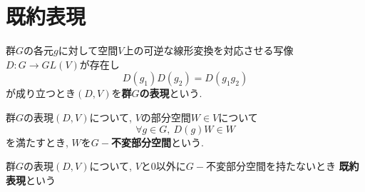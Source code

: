 \section{既約表現}

\begin{deftcolorbox}[title = 群の表現]
    群$G$の各元$g$に対して空間$V$上の可逆な線形変換を対応させる写像$D : G \rightarrow GL(V)$が存在し
    \begin{equation*}
        D(g_1)D(g_2) = D(g_1 g_2)
    \end{equation*}
    が成り立つとき$(D,V)$を\textbf{群$G$の表現}という.
\end{deftcolorbox}

\begin{deftcolorbox}[title = 不変部分空間]
    群$G$の表現$(D,V)$について, $V$の部分空間$W \in V$について
    \begin{equation*}
        \forall g \in G,\ D(g)W \in W
    \end{equation*}
    を満たすとき, $W$を\textbf{$G-$不変部分空間}という.
\end{deftcolorbox}

\begin{deftcolorbox}[title = 既約表現]
    群$G$の表現$(D,V)$について, $V$と$0$以外に$G-$不変部分空間を持たないとき
    \textbf{既約表現}という
\end{deftcolorbox}